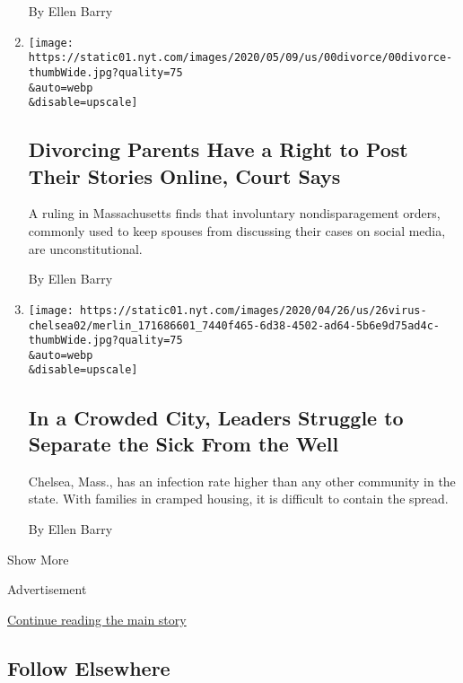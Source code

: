 \begin{enumerate}
  By Ellen Barry
\item
  \href{/2020/05/09/us/divorcing-parents-have-right-to-post-court-says.html}{}

  \texttt{[image: https://static01.nyt.com/images/2020/05/09/us/00divorce/00divorce-thumbWide.jpg?quality=75\\\&auto=webp\\\&disable=upscale]}

  \hypertarget{divorcing-parents-have-a-right-to-post-their-stories-online-court-says}{%
  \subsection{Divorcing Parents Have a Right to Post Their Stories
  Online, Court
  Says}\label{divorcing-parents-have-a-right-to-post-their-stories-online-court-says}}

  A ruling in Massachusetts finds that involuntary nondisparagement
  orders, commonly used to keep spouses from discussing their cases on
  social media, are unconstitutional.

  By Ellen Barry
\item
  \href{/2020/04/25/us/coronavirus-chelsea-massachusetts.html}{}

  \texttt{[image: https://static01.nyt.com/images/2020/04/26/us/26virus-chelsea02/merlin\_171686601\_7440f465-6d38-4502-ad64-5b6e9d75ad4c-thumbWide.jpg?quality=75\\\&auto=webp\\\&disable=upscale]}

  \hypertarget{in-a-crowded-city-leaders-struggle-to-separate-the-sick-from-the-well}{%
  \subsection{In a Crowded City, Leaders Struggle to Separate the Sick
  From the
  Well}\label{in-a-crowded-city-leaders-struggle-to-separate-the-sick-from-the-well}}

  Chelsea, Mass., has an infection rate higher than any other community
  in the state. With families in cramped housing, it is difficult to
  contain the spread.

  By Ellen Barry
\end{enumerate}

Show More

Advertisement

\protect\hyperlink{after-mid2}{Continue reading the main story}

\hypertarget{follow-elsewhere}{%
\subsection{Follow Elsewhere}\label{follow-elsewhere}}

